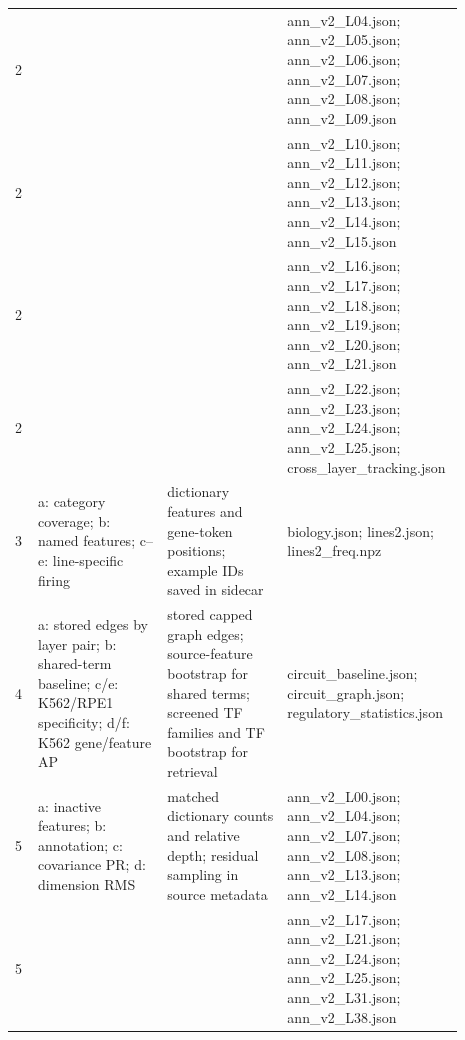 \begin{longtable}{@{}L{0.05\linewidth}L{0.28\linewidth}L{0.26\linewidth}L{0.3\linewidth}@{}}
2 &  &  & ann\_\allowbreak{}v2\_\allowbreak{}L04.json; ann\_\allowbreak{}v2\_\allowbreak{}L05.json; ann\_\allowbreak{}v2\_\allowbreak{}L06.json; ann\_\allowbreak{}v2\_\allowbreak{}L07.json; ann\_\allowbreak{}v2\_\allowbreak{}L08.json; ann\_\allowbreak{}v2\_\allowbreak{}L09.json \\
2 &  &  & ann\_\allowbreak{}v2\_\allowbreak{}L10.json; ann\_\allowbreak{}v2\_\allowbreak{}L11.json; ann\_\allowbreak{}v2\_\allowbreak{}L12.json; ann\_\allowbreak{}v2\_\allowbreak{}L13.json; ann\_\allowbreak{}v2\_\allowbreak{}L14.json; ann\_\allowbreak{}v2\_\allowbreak{}L15.json \\
2 &  &  & ann\_\allowbreak{}v2\_\allowbreak{}L16.json; ann\_\allowbreak{}v2\_\allowbreak{}L17.json; ann\_\allowbreak{}v2\_\allowbreak{}L18.json; ann\_\allowbreak{}v2\_\allowbreak{}L19.json; ann\_\allowbreak{}v2\_\allowbreak{}L20.json; ann\_\allowbreak{}v2\_\allowbreak{}L21.json \\
2 &  &  & ann\_\allowbreak{}v2\_\allowbreak{}L22.json; ann\_\allowbreak{}v2\_\allowbreak{}L23.json; ann\_\allowbreak{}v2\_\allowbreak{}L24.json; ann\_\allowbreak{}v2\_\allowbreak{}L25.json; cross\_\allowbreak{}layer\_\allowbreak{}tracking.json \\
3 & a: category coverage; b: named features; c--e: line-specific firing & dictionary features and gene-token positions; example IDs saved in sidecar & biology.json; lines2.json; lines2\_\allowbreak{}freq.npz \\
4 & a: stored edges by layer pair; b: shared-term baseline; c/e: K562/RPE1 specificity; d/f: K562 gene/feature AP & stored capped graph edges; source-feature bootstrap for shared terms; screened TF families and TF bootstrap for retrieval & circuit\_\allowbreak{}baseline.json; circuit\_\allowbreak{}graph.json; regulatory\_\allowbreak{}statistics.json \\
5 & a: inactive features; b: annotation; c: covariance PR; d: dimension RMS & matched dictionary counts and relative depth; residual sampling in source metadata & ann\_\allowbreak{}v2\_\allowbreak{}L00.json; ann\_\allowbreak{}v2\_\allowbreak{}L04.json; ann\_\allowbreak{}v2\_\allowbreak{}L07.json; ann\_\allowbreak{}v2\_\allowbreak{}L08.json; ann\_\allowbreak{}v2\_\allowbreak{}L13.json; ann\_\allowbreak{}v2\_\allowbreak{}L14.json \\
5 &  &  & ann\_\allowbreak{}v2\_\allowbreak{}L17.json; ann\_\allowbreak{}v2\_\allowbreak{}L21.json; ann\_\allowbreak{}v2\_\allowbreak{}L24.json; ann\_\allowbreak{}v2\_\allowbreak{}L25.json; ann\_\allowbreak{}v2\_\allowbreak{}L31.json; ann\_\allowbreak{}v2\_\allowbreak{}L38.json \\

\end{longtable}
